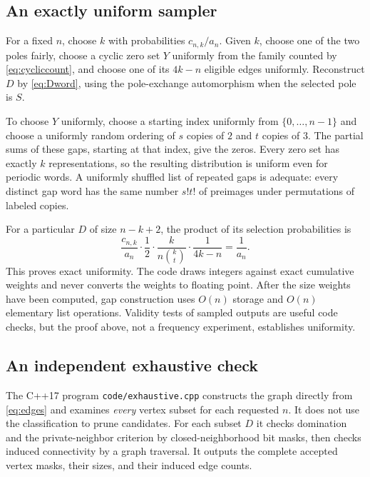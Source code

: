 \documentclass[11pt,letterpaper]{article}
\numberwithin{equation}{section}
\theoremstyle{definition}
\newcommand{\1}{\mathbf 1}
\begin{document}
\subsection{An exactly uniform sampler}
For a fixed $n$, choose $k$ with probabilities $c_{n,k}/a_n$. Given $k$, choose
one of the two poles fairly, choose a cyclic zero set $Y$ uniformly from the
family counted by \eqref{eq:cycliccount}, and choose one of its $4k-n$ eligible
edges uniformly. Reconstruct $D$ by \eqref{eq:Dword}, using the pole-exchange
automorphism when the selected pole is $S$.

To choose $Y$ uniformly, choose a starting index uniformly from
$\{0,\ldots,n-1\}$ and choose a uniformly random ordering of $s$ copies of $2$
and $t$ copies of $3$. The partial sums of these gaps, starting at that index,
give the zeros. Every zero set has exactly $k$ representations, so the
resulting distribution is uniform even for periodic words. A uniformly
shuffled list of repeated gaps is adequate: every distinct gap word has the
same number $s!t!$ of preimages under permutations of labeled copies.

For a particular $D$ of size $n-k+2$, the product of its selection probabilities is
\[
 \frac{c_{n,k}}{a_n}\cdot\frac12\cdot
 \frac{k}{n\binom{k}{t}}\cdot\frac1{4k-n}=\frac1{a_n}.
\]
This proves exact uniformity. The code draws integers against exact cumulative
weights and never converts the weights to floating point. After the size
weights have been computed, gap construction uses $O(n)$ storage and $O(n)$
elementary list operations. Validity tests of sampled outputs are useful code
checks, but the proof above, not a frequency experiment, establishes uniformity.

\subsection{An independent exhaustive check}
The C++17 program \texttt{code/exhaustive.cpp} constructs the graph directly
from \eqref{eq:edges} and examines \emph{every} vertex subset for each requested
$n$. It does not use the classification to prune candidates. For each subset
$D$ it checks domination and the private-neighbor criterion by closed-neighborhood
bit masks, then checks induced connectivity by a graph traversal. It outputs
the complete accepted vertex masks, their sizes, and their induced edge counts.
\end{document}
